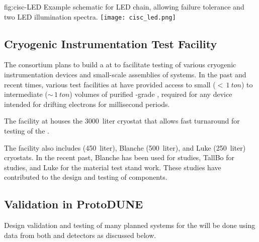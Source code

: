 \begin{dunefigure}{fig:cisc-LED}
  {Example schematic for LED chain, allowing failure tolerance and two LED illumination spectra.}
  \texttt{[image: cisc\_led.png]}
\end{dunefigure}


\subsection{Cryogenic Instrumentation Test Facility}
The  consortium plans to build a  at \fnal to facilitate testing of various cryogenic instrumentation devices and small-scale assemblies of  systems. 
In the past and recent times, various test facilities at \fnal have provided access to small ($<\,\SI{1}{ton}$) to intermediate ($\sim\,\SI{1}{ton}$) volumes of purified -grade , required for %
any device intended for drifting electrons for millisecond periods. 

The  
facility at \fnal houses the  \SI {3000} {liter} cryostat that allows fast turnaround for testing of the  . 

The  facility also includes  (\SI {450} {liter}), Blanche (\SI {500} {liter}), and Luke (\SI {250} {liter}) cryostats. %
In the recent past, Blanche has been used for  studies, TallBo for  studies, and Luke for the material test stand work. These studies have contributed to the design and testing of   components.

\subsection{Validation in ProtoDUNE}
\label{sec:pddp-cryo-valid}


Design validation and testing of many planned  systems for the    will be done using data from both  and  detectors as discussed below.

